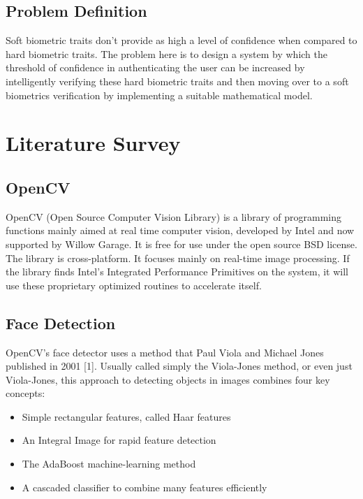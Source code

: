 \documentclass[12pt]{article}			%
\begin{document}
\subsection{ Problem Definition }
Soft biometric traits don’t provide as high a level of confidence when compared to hard biometric traits. The problem here is to design a system by which the threshold of confidence in authenticating the user can be increased by intelligently verifying these hard biometric traits and then moving over to a soft biometrics verification by implementing a suitable mathematical model.


\section{Literature Survey }

\subsection{ OpenCV }
OpenCV (Open Source Computer Vision Library) is a library of programming functions mainly aimed at real time computer vision, developed by Intel and now supported by Willow Garage. It is free for use under the open source BSD license. The library is cross-platform. It focuses mainly on real-time image processing. If the library finds Intel's Integrated Performance Primitives on the system, it will use these proprietary optimized routines to accelerate itself.

\subsection{ Face Detection }
OpenCV's face detector uses a method that Paul Viola and Michael Jones published in 2001 [1]. Usually called simply the Viola-Jones method, or even just Viola-Jones, this approach to detecting objects in images combines four key concepts:
\begin{itemize}
	\item{} Simple rectangular features, called Haar features
	\item{} An Integral Image for rapid feature detection
	\item{} The AdaBoost machine-learning method
	\item{} A cascaded classifier to combine many features efficiently
\end{itemize}
\end{document}
